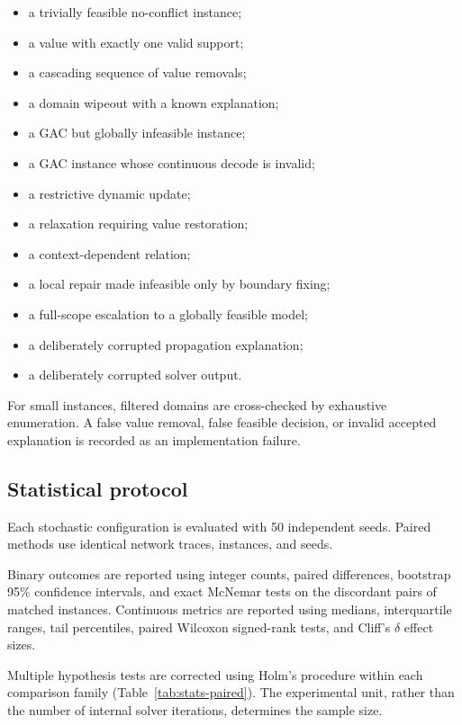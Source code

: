 \documentclass[pdflatex,sn-mathphys-num,iicol,oneside]{sn-jnl}
\begin{document}
\begin{itemize}
    \item a trivially feasible no-conflict instance;
    \item a value with exactly one valid support;
    \item a cascading sequence of value removals;
    \item a domain wipeout with a known explanation;
    \item a GAC but globally infeasible instance;
    \item a GAC instance whose continuous decode is invalid;
    \item a restrictive dynamic update;
    \item a relaxation requiring value restoration;
    \item a context-dependent relation;
    \item a local repair made infeasible only by boundary fixing;
    \item a full-scope escalation to a globally feasible model;
    \item a deliberately corrupted propagation explanation;
    \item a deliberately corrupted solver output.
\end{itemize}

For small instances, filtered domains are cross-checked by exhaustive
enumeration. A false value removal, false feasible decision, or
invalid accepted explanation is recorded as an implementation failure.

\subsection{Statistical protocol}

Each stochastic configuration is evaluated with
50 independent seeds.
Paired methods use identical network traces, instances, and seeds.

Binary outcomes are reported using integer counts, paired differences,
bootstrap 95\% confidence intervals, and exact McNemar tests on the
discordant pairs of matched instances. Continuous metrics are reported
using medians, interquartile ranges, tail percentiles, paired Wilcoxon
signed-rank tests, and Cliff's $\delta$ effect sizes.

Multiple hypothesis tests are corrected using Holm's procedure within
each comparison family (Table~\ref{tab:stats-paired}). The
experimental unit, rather than the number of internal solver
iterations, determines the sample size.
\end{document}
